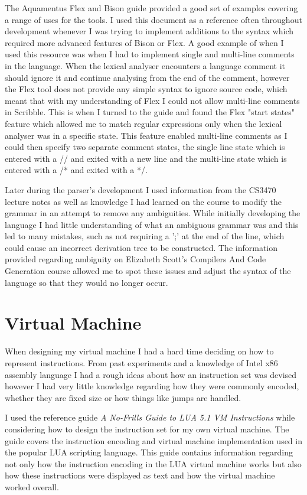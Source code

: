 \documentclass[]{final_report}
\begin{document}
The Aquamentus Flex and Bison guide\cite{AQBISON} provided a good set of examples covering a range of uses for the tools. I used this document as a reference often throughout development whenever I was trying to implement additions to the syntax which required more advanced features of Bison or Flex. A good example of when I used this resource was when I had to implement single and multi-line comments in the language. When the lexical analyser encounters a language comment it should ignore it and continue analysing from the end of the comment, however the Flex tool does not provide any simple syntax to ignore source code, which meant that with my understanding of Flex I could not allow multi-line comments in Scribble. This is when I turned to the guide and found the Flex "start states" feature which allowed me to match regular expressions only when the lexical analyser was in a specific state. This feature enabled multi-line comments as I could then specify two separate comment states, the single line state which is entered with a // and exited with a new line and the multi-line state which is entered with a /* and exited with a */.

Later during the parser's development I used information from the CS3470 lecture notes\cite{CS3470} as well as knowledge I had learned on the course to modify the grammar in an attempt to remove any ambiguities. While initially developing the language I had little understanding of what an ambiguous grammar was and this led to many mistakes, such as not requiring a ';' at the end of the line, which could cause an incorrect derivation tree to be constructed. The information provided regarding ambiguity on Elizabeth Scott's Compilers And Code Generation course allowed me to spot these issues and adjust the syntax of the language so that they would no longer occur.

\section{Virtual Machine}

When designing my virtual machine I had a hard time deciding on how to represent instructions. From past experiments and a knowledge of Intel x86 assembly language I had a rough ideas about how an instruction set was devised however I had very little knowledge regarding how they were commonly encoded, whether they are fixed size or how things like jumps are handled.

I used the reference guide \emph{A No-Frills Guide to LUA 5.1 VM Instructions}\cite{NOFRILLLUA} while considering how to design the instruction set for my own virtual machine. The guide covers the instruction encoding and virtual machine implementation used in the popular LUA scripting language. This guide contains information regarding not only how the instruction encoding in the LUA virtual machine works but also how these instructions were displayed as text and how the virtual machine worked overall.
\end{document}
